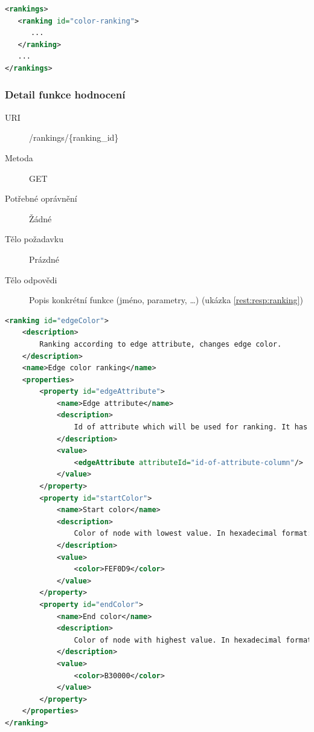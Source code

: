 \documentclass[thesis=M,czech]{FITthesis}[2014/05/6]
\begin{document}
\begin{lstlisting}[caption=Tělo odpovědi zdroje /rankings (GET), label=rest:resp:rankings, language=xml]
<rankings>
   <ranking id="color-ranking">
      ...
   </ranking>
   ...
</rankings>
\end{lstlisting}  

\subsubsection{Detail funkce hodnocení}
\begin{description}
  \item[URI] /rankings/\{ranking\_id\}
  \item[Metoda] GET
  \item[Potřebné oprávnění] Žádné
  \item[Tělo požadavku] Prázdné
  \item[Tělo odpovědi] Popis konkrétní funkce (jméno, parametry, \ldots) (ukázka \ref{rest:resp:ranking})
\end{description}

\begin{lstlisting}[caption=Tělo odpovědi zdroje /rankings/\{ranking\_id\} (GET), label=rest:resp:ranking, language=xml]
<ranking id="edgeColor">
    <description>
        Ranking according to edge attribute, changes edge color.
    </description>
    <name>Edge color ranking</name>
    <properties>
        <property id="edgeAttribute">
            <name>Edge attribute</name>
            <description>
                Id of attribute which will be used for ranking. It has to be one of already calculated edge attributes (see GEXF format)
            </description>
            <value>
                <edgeAttribute attributeId="id-of-attribute-column"/>
            </value>
        </property>
        <property id="startColor">
            <name>Start color</name>
            <description>
                Color of node with lowest value. In hexadecimal format: RRGGBB, e.g. FEF0D9
            </description>
            <value>
                <color>FEF0D9</color>
            </value>
        </property>
        <property id="endColor">
            <name>End color</name>
            <description>
                Color of node with highest value. In hexadecimal format: RRGGBB, e.g. B30000
            </description>
            <value>
                <color>B30000</color>
            </value>
        </property>
    </properties>
</ranking>
\end{lstlisting}  
\end{document}
